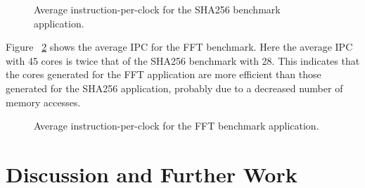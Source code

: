 \documentclass{UoYCSproject}
\begin{document}
\begin{figure}[H]
\caption{Average instruction-per-clock for the SHA256 benchmark application.}
\label{fig:ipcSHA256}
\end{figure}

Figure ~\ref{fig:ipcFFT} shows the average IPC for the FFT benchmark.
Here the average IPC with 45 cores is twice that of the SHA256 benchmark with 28.
This indicates that the cores generated for the FFT application are more efficient
than those generated for the SHA256 application, probably due to a decreased number of memory
accesses.

\begin{figure}[H]
\caption{Average instruction-per-clock for the FFT benchmark application.}
\label{fig:ipcFFT}
\end{figure}

\chapter{Discussion and Further Work}
\end{document}
